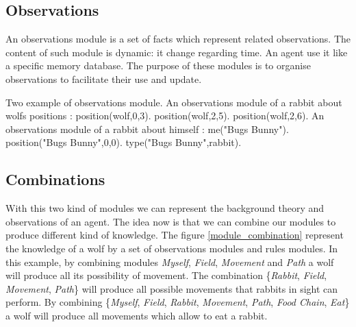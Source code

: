 \documentclass{aamas2012}
\begin{document}
\subsection{Observations}

	\begin{definition}
		An observations module is a set of facts which represent related observations.
		The content of such module is dynamic: it change regarding time.
		An agent use it like a specific memory database.
		The purpose of these modules is to organise observations to facilitate their use and update.
	\end{definition}
	
	\begin{example}
		Two example of observations module.
		\newline
		An observations module of a rabbit about wolfs positions :\newline
		\newline
		position(wolf,0,3).\newline
		position(wolf,2,5).\newline
		position(wolf,2,6).\newline
		\newline
		An observations module of a rabbit about himself : \newline
		\newline
		me("Bugs Bunny").\newline
		position("Bugs Bunny",0,0).\newline
		type("Bugs Bunny",rabbit).\newline
	\end{example}
	
\subsection{Combinations}

	With this two kind of modules we can represent the background theory and observations of an agent.
	The idea now is that we can combine our modules to produce different kind of knowledge.
	The figure \ref{module_combination} represent the knowledge of a wolf by a set of observations modules and rules modules.
	In this example, by combining modules \textit{Myself}, \textit{Field}, \textit{Movement} and \textit{Path} 
	a wolf will produce all its possibility of movement.
	The combination \{\textit{Rabbit}, \textit{Field}, \textit{Movement}, \textit{Path}\} will produce all possible movements that rabbits in sight can perform. 
	By combining \{\textit{Myself}, \textit{Field}, \textit{Rabbit}, \textit{Movement}, \textit{Path}, \textit{Food Chain}, \textit{Eat}\} a wolf will produce
	all movements which allow to eat a rabbit.
	
\end{document}
